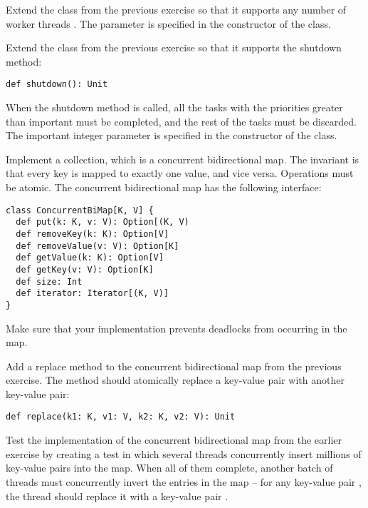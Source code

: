 \documentclass[11pt]{article}
\begin{document}
\begin{myExercise}Extend the  class from the previous exercise so that it supports any number of worker threads . The parameter  is specified in the constructor of the  class.
\end{myExercise}

\begin{myExercise}Extend the  class from the previous exercise so that it supports the shutdown method:
\begin{lstlisting}
def shutdown(): Unit
\end{lstlisting}
When the shutdown method is called, all the tasks with the priorities greater than important must be completed, and the rest of the tasks must be discarded. The important integer parameter is specified in the constructor of the  class.
\end{myExercise}

\begin{myExercise}Implement a  collection, which is a concurrent bidirectional map. The invariant is that every key is mapped to exactly one value, and vice versa. Operations must be atomic. The concurrent bidirectional map has the following interface:
\begin{lstlisting}
class ConcurrentBiMap[K, V] {
  def put(k: K, v: V): Option[(K, V)
  def removeKey(k: K): Option[V]
  def removeValue(v: V): Option[K]
  def getValue(k: K): Option[V]
  def getKey(v: V): Option[K]
  def size: Int
  def iterator: Iterator[(K, V)]
}
\end{lstlisting}
Make sure that your implementation prevents deadlocks from occurring in the map.
\end{myExercise}

\begin{myExercise}Add a replace method to the concurrent bidirectional map from the previous exercise. The method should atomically replace a key-value pair with another key-value pair:
\begin{lstlisting}
def replace(k1: K, v1: V, k2: K, v2: V): Unit
\end{lstlisting}
\end{myExercise}

\begin{myExercise}Test the implementation of the concurrent bidirectional map from the earlier exercise by creating a test in which several threads concurrently insert millions of key-value pairs into the map. When all of them complete, another batch of threads must concurrently invert the entries in the map -- for any key-value pair , the thread should replace it with a key-value pair .
\end{myExercise}
\end{document}

